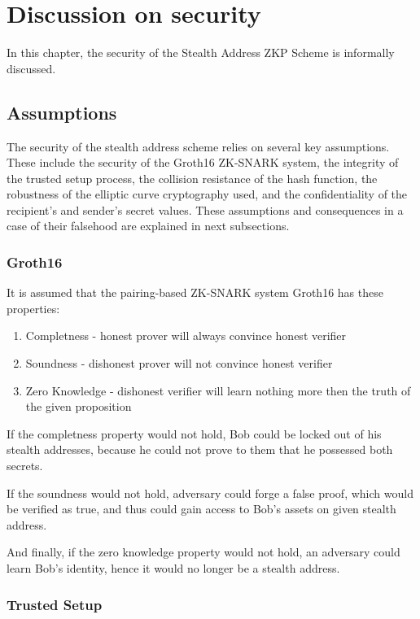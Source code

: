 \chapter{Discussion on security}\label{chapter:security}

In this chapter, the security of the Stealth Address ZKP Scheme is informally discussed.

\section{Assumptions}

The security of the stealth address scheme relies on several key assumptions.
These include the security of the Groth16 ZK-SNARK system, the integrity of
the trusted setup process, the collision resistance of the hash function, the
robustness of the elliptic curve cryptography used, and the
confidentiality of the recipient's and sender's secret values. These
assumptions and consequences in a case of their falsehood are explained in next
subsections.


\subsection{Groth16}

It is assumed that the pairing-based ZK-SNARK system Groth16 \cite{Groth16} has these properties:
\begin{enumerate}
    \item Completness - honest prover will always convince honest verifier
    \item Soundness - dishonest prover will not convince honest verifier
    \item Zero Knowledge - dishonest verifier will learn nothing more then the truth of the given proposition
\end{enumerate}

If the completness property would not hold, Bob could be locked out of his stealth
addresses, because he could not prove to them that he possessed both secrets.

If the soundness would not hold, adversary could forge a false proof, which
would be verified as true, and thus could gain access to Bob's assets on given
stealth address.

And finally, if the zero knowledge property would not hold, an adversary could
learn Bob's identity, hence it would no longer be a stealth address.

\subsection{Trusted Setup}

